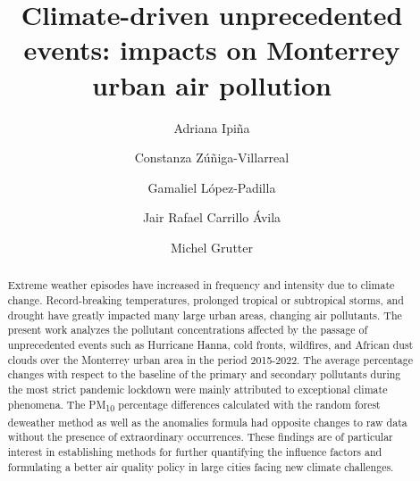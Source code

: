 \documentclass[preprint,12pt]{elsarticle}
\begin{document}
\begin{frontmatter}
	\title{
		Climate-driven unprecedented events: impacts on Monterrey urban air pollution
	}
	\author[1]{Adriana Ipiña}
	\author[2]{Constanza Zúñiga-Villarreal}
	\author[3]{Gamaliel López-Padilla}
	\author[4]{Jair Rafael Carrillo Ávila}
	\author[5]{Michel Grutter}
	\vspace{-1em}
	\begin{abstract}
		Extreme weather episodes have increased in frequency and intensity due to climate change. Record-breaking temperatures, prolonged tropical or subtropical storms, and drought have greatly impacted many large urban areas, changing air pollutants. The present work analyzes the pollutant concentrations affected by the passage of unprecedented events such as Hurricane Hanna, cold fronts, wildfires, and African dust clouds over the Monterrey urban area in the period 2015-2022. The average percentage changes with respect to the baseline of the primary and secondary pollutants during the most strict pandemic lockdown were mainly attributed to exceptional climate phenomena. The PM\textsubscript{10} percentage differences calculated with the random forest deweather method as well as the anomalies formula had opposite changes to raw data without the presence of extraordinary occurrences. These findings are of particular interest in establishing methods for further quantifying the influence factors and formulating a better air quality policy in large cities facing new climate challenges.

\end{abstract}
\end{frontmatter}
\end{document}
